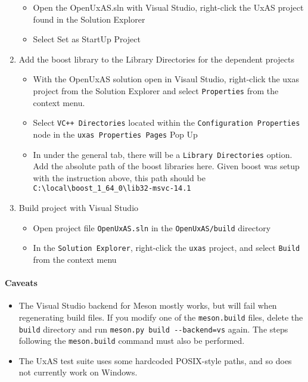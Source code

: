 \begin{enumerate}
  \begin{itemize}
  \item
    Open the OpenUxAS.sln with Visual Studio, right-click the UxAS
    project found in the Solution Explorer
  \item
    Select Set as StartUp Project
  \end{itemize}
\item
  Add the boost library to the Library Directories for the dependent
  projects

  \begin{itemize}
  \item
    With the OpenUxAS solution open in Visaul Studio, right-click the
    uxas project from the Solution Explorer and select
    \texttt{Properties} from the context menu.
  \item
    Select \texttt{VC++\ Directories} located within the
    \texttt{Configuration\ Properties} node in the
    \texttt{uxas\ Properties\ Pages} Pop Up
  \item
    In under the general tab, there will be a
    \texttt{Library\ Directories} option. Add the absolute path of the
    boost libraries here. Given boost was setup with the instruction
    above, this path should be
    \texttt{C:\textbackslash{}local\textbackslash{}boost\_1\_64\_0\textbackslash{}lib32-msvc-14.1}
  \end{itemize}
\item
  Build project with Visual Studio

  \begin{itemize}
  \item
    Open project file \texttt{OpenUxAS.sln} in the
    \texttt{OpenUxAS/build} directory
  \item
    In the \texttt{Solution\ Explorer}, right-click the \texttt{uxas}
    project, and select \texttt{Build} from the context menu
  \end{itemize}
\end{enumerate}

\paragraph{Caveats}\label{caveats}

\begin{itemize}
\item
  The Visual Studio backend for Meson mostly works, but will fail when
  regenerating build files. If you modify one of the
  \texttt{meson.build} files, delete the \texttt{build} directory and
  run \texttt{meson.py\ build\ -\/-backend=vs} again. The steps
  following the \texttt{meson.build} command must also be performed.
\item
  The UxAS test suite uses some hardcoded POSIX-style paths, and so does
  not currently work on Windows.
\end{itemize}
